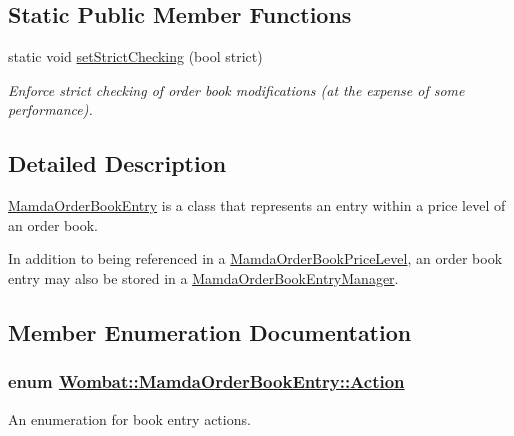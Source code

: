 \subsection*{Static Public Member Functions}
\begin{CompactItemize}
\item 
static void \hyperlink{classWombat_1_1MamdaOrderBookEntry_b39d4646a59b7285c4f4fe6fb71ef43a}{set\-Strict\-Checking} (bool strict)
\begin{CompactList}\small\item\em Enforce strict checking of order book modifications (at the expense of some performance). \item\end{CompactList}\end{CompactItemize}


\subsection{Detailed Description}
\hyperlink{classWombat_1_1MamdaOrderBookEntry}{Mamda\-Order\-Book\-Entry} is a class that represents an entry within a price level of an order book. 

In addition to being referenced in a \hyperlink{classWombat_1_1MamdaOrderBookPriceLevel}{Mamda\-Order\-Book\-Price\-Level}, an order book entry may also be stored in a \hyperlink{classWombat_1_1MamdaOrderBookEntryManager}{Mamda\-Order\-Book\-Entry\-Manager}. 



\subsection{Member Enumeration Documentation}
\hypertarget{classWombat_1_1MamdaOrderBookEntry_fc6cb1d67c7601d093a36f59cf9bcef4}{
\subsubsection[Action]{\setlength{\rightskip}{0pt plus 5cm}enum \hyperlink{classWombat_1_1MamdaOrderBookEntry_fc6cb1d67c7601d093a36f59cf9bcef4}{Wombat::Mamda\-Order\-Book\-Entry::Action}}}
\label{classWombat_1_1MamdaOrderBookEntry_fc6cb1d67c7601d093a36f59cf9bcef4}


An enumeration for book entry actions. 

